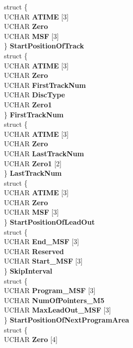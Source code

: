 \begin{DoxyCompactItemize}
\begin{tabbing}
\>struct \{\\
\>\>UCHAR {\bfseries ATIME} \mbox{[}3\mbox{]}\\
\>\>UCHAR {\bfseries Zero}\\
\>\>UCHAR {\bfseries MSF} \mbox{[}3\mbox{]}\\
\>\} {\bfseries StartPositionOfTrack}\\
\>struct \{\\
\>\>UCHAR {\bfseries ATIME} \mbox{[}3\mbox{]}\\
\>\>UCHAR {\bfseries Zero}\\
\>\>UCHAR {\bfseries FirstTrackNum}\\
\>\>UCHAR {\bfseries DiscType}\\
\>\>UCHAR {\bfseries Zero1}\\
\>\} {\bfseries FirstTrackNum}\\
\>struct \{\\
\>\>UCHAR {\bfseries ATIME} \mbox{[}3\mbox{]}\\
\>\>UCHAR {\bfseries Zero}\\
\>\>UCHAR {\bfseries LastTrackNum}\\
\>\>UCHAR {\bfseries Zero1} \mbox{[}2\mbox{]}\\
\>\} {\bfseries LastTrackNum}\\
\>struct \{\\
\>\>UCHAR {\bfseries ATIME} \mbox{[}3\mbox{]}\\
\>\>UCHAR {\bfseries Zero}\\
\>\>UCHAR {\bfseries MSF} \mbox{[}3\mbox{]}\\
\>\} {\bfseries StartPositionOfLeadOut}\\
\>struct \{\\
\>\>UCHAR {\bfseries End\_MSF} \mbox{[}3\mbox{]}\\
\>\>UCHAR {\bfseries Reserved}\\
\>\>UCHAR {\bfseries Start\_MSF} \mbox{[}3\mbox{]}\\
\>\} {\bfseries SkipInterval}\\
\>struct \{\\
\>\>UCHAR {\bfseries Program\_MSF} \mbox{[}3\mbox{]}\\
\>\>UCHAR {\bfseries NumOfPointers\_M5}\\
\>\>UCHAR {\bfseries MaxLeadOut\_MSF} \mbox{[}3\mbox{]}\\
\>\} {\bfseries StartPositionOfNextProgramArea}\\
\>struct \{\\
\>\>UCHAR {\bfseries Zero} \mbox{[}4\mbox{]}\\

\end{tabbing}
\end{DoxyCompactItemize}
